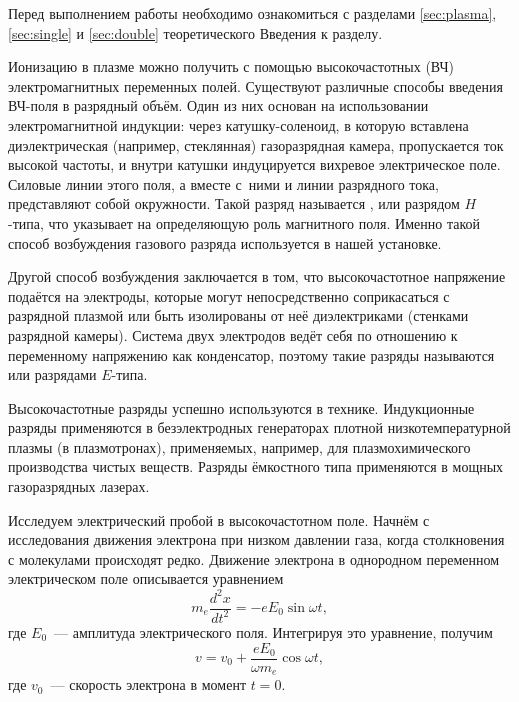 


Перед выполнением работы необходимо ознакомиться с разделами
\ref{sec:plasma}, \ref{sec:single} и \ref{sec:double} теоретического Введения
к разделу.

Ионизацию в плазме можно получить с помощью высокочастотных (ВЧ)
электромагнитных переменных полей. Существуют различные способы введения ВЧ-поля
в разрядный объём. Один из них основан на использовании электромагнитной
индукции: через катушку-соленоид, в которую вставлена диэлектрическая
(например, стеклянная) газоразрядная камера, пропускается ток высокой частоты,
и внутри катушки индуцируется вихревое электрическое поле.
Силовые линии этого поля, а вместе с~ними и линии разрядного тока,
представляют собой окружности. Такой разряд называется ,
 или разрядом $H$-типа, что указывает
на определяющую роль магнитного поля. Именно такой способ возбуждения газового
разряда используется в нашей установке.

Другой способ возбуждения заключается в том, что высокочастотное напряжение
подаётся на электроды, которые могут непосредственно соприкасаться с разрядной
плазмой или быть изолированы от неё диэлектриками (стенками разрядной камеры).
Система двух электродов ведёт себя по отношению к переменному напряжению как
конденсатор, поэтому такие разряды называются  или
разрядами $E$-типа.

Высокочастотные разряды успешно используются в технике. Индукционные разряды
применяются в безэлектродных генераторах плотной низкотемпературной плазмы
(в плазмотронах), применяемых, например, для плазмохимического производства
чистых
веществ. Разряды ёмкостного типа применяются в мощных газоразрядных лазерах.

Исследуем электрический пробой в высокочастотном поле. Начнём с исследования
движения электрона при низком давлении газа, когда столкновения с молекулами
происходят редко. Движение электрона в однородном переменном электрическом поле
описывается уравнением
\begin{equation*}
    m_e\frac{d^2x}{dt^2}=-eE_0\sin\omega t,
\end{equation*}
где $E_0$~--- амплитуда электрического поля. Интегрируя это уравнение, получим
\begin{equation*}
    v=v_0+\frac{eE_0}{\omega m_e}\cos\omega t,
\end{equation*}
где $v_0$~--- скорость электрона в момент $t=0$.

